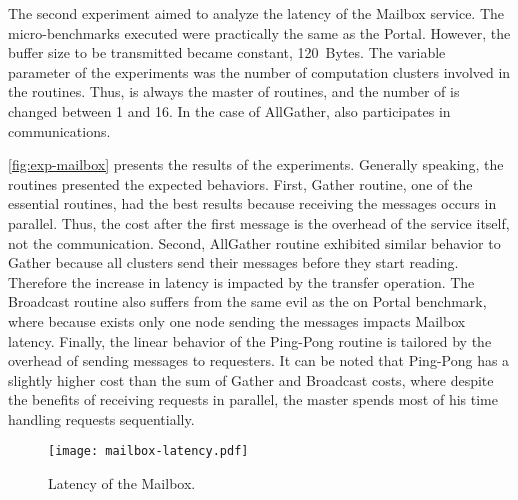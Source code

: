 		The second experiment aimed to analyze the latency of the Mailbox
		service. The micro-benchmarks executed were practically the same
		as the Portal. However, the buffer size to be transmitted became
		constant, 120~Bytes. The variable parameter of the experiments was
		the number of computation clusters involved in the routines.
		Thus, \iocluster is always the master of routines, and the number
		of \ccluster is changed between 1 and 16. In the case of AllGather,
		\iocluster also participates in communications.

		\autoref{fig:exp-mailbox} presents the results of the experiments.
		Generally speaking, the routines presented the expected behaviors.
		First, Gather routine, one of the essential routines, had the best
		results because receiving the messages occurs in parallel. Thus,
		the cost after the first message is the overhead of the service
		itself, not the communication. Second, AllGather routine exhibited
		similar behavior to Gather because all clusters send their messages
		before they start reading. Therefore the increase in latency is
		impacted by the transfer operation. The Broadcast routine also
		suffers from the same evil as the on Portal benchmark, where because
		exists only one node sending the messages impacts Mailbox latency.
		Finally, the linear behavior of the Ping-Pong routine is tailored
		by the overhead of sending messages to requesters. It can be noted
		that Ping-Pong has a slightly higher cost than the sum of Gather
		and Broadcast costs, where despite the benefits of receiving
		requests in parallel, the master spends most of his time handling
		requests sequentially.

		\begin{figure}[!tb]
			\centering%
			\caption{Latency of the Mailbox.}%
			\label{fig:exp-mailbox}%
			\texttt{[image: mailbox-latency.pdf]}%
		\end{figure}
